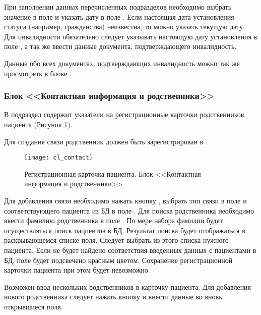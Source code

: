 При заполнении данных перечисленных подразделов необходимо выбрать значение в поле  и указать дату в поле . Если настоящая дата установления статуса (например, гражданства) неизвестна, то можно указать текущую дату. Для инвалидности обязательно следует указывать настоящую дату установления в поле , а так же ввести данные документа, подтверждающего инвалидность.


\begin{prim}
Данные обо всех документах, подтверждающих инвалидность можно так же просмотреть в блоке .
\end{prim}
 
\subsubsection{Блок <<Контактная информация и родственники>>}

В подраздел  содержит указатели на регистрационные карточки родственников пациента (Рисунок \ref{img_cl_contact}). 

\begin{vnim}
Для создания связи родственник должен быть зарегистрирован в \tmis.
\end{vnim}

\begin{figure}[ht!]\centering
 \texttt{[image: cl\_contact]}
 \caption{Регистрационная карточка пациента. Блок <<Контактная информация и родственники>>}
 \label{img_cl_contact}
\end{figure} 

Для добавления связи необходимо нажать кнопку , выбрать тип связи в поле  и соответствующего пациента из БД в поле . Для поиска родственника необходимо ввести фамилию родственника в поле . По мере набора фамилии будет осуществляться поиск пациентов в БД. Результат поиска будет отображаться в раскрывающемся списке поля. Следует выбрать из этого списка нужного пациента. Если не будет найдено соответствия введенных данных с пациентами в БД, поле  будет подсвечено красным цветом. Сохранение регистрационной карточки пациента при этом будет невозможно.

Возможен ввод нескольких родственников в карточку пациента. Для добавления нового родственника следует нажать кнопку  и внести данные во вновь открывшиеся поля.

